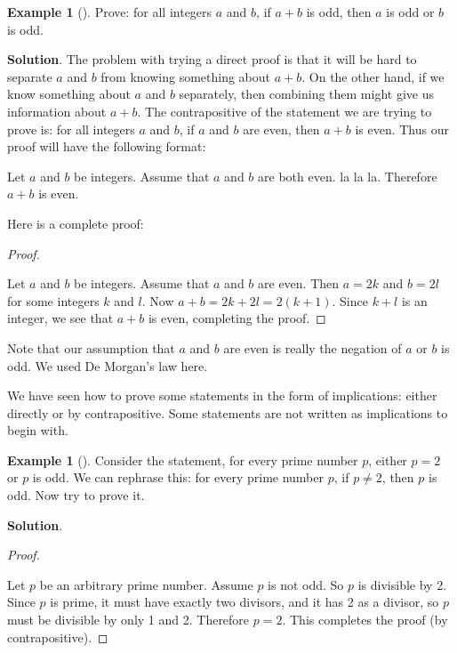 \documentclass[10pt,]{book}
\theoremstyle{plain}
\theoremstyle{definition}
\theoremstyle{definition}
\newtheorem{example}[theorem]{Example}
\theoremstyle{definition}
\theoremstyle{definition}
\numberwithin{equation}{chapter}
\begin{document}
\begin{example}[]\label{example-67}
\hypertarget{p-2065}{}%
Prove: for all integers \(a\) and \(b\), if \(a + b\) is odd, then \(a\) is odd or \(b\) is odd.%
\par\smallskip%
\noindent\textbf{Solution}.\hypertarget{solution-184}{}\quad%
\hypertarget{p-2066}{}%
The problem with trying a direct proof is that it will be hard to separate \(a\) and \(b\) from knowing something about \(a+b\). On the other hand, if we know something about \(a\) and \(b\) separately, then combining them might give us information about \(a+b\). The contrapositive of the statement we are trying to prove is: for all integers \(a\) and \(b\), if \(a\) and \(b\) are even, then \(a+b\) is even. Thus our proof will have the following format:%
\par
\hypertarget{p-2067}{}%
Let \(a\) and \(b\) be integers. Assume that \(a\) and \(b\) are both even. la la la. Therefore \(a+b\) is even.%
\par
\hypertarget{p-2068}{}%
Here is a complete proof:%
\begin{proof}\hypertarget{proof-24}{}
\hypertarget{p-2069}{}%
Let \(a\) and \(b\) be integers. Assume that \(a\) and \(b\) are even. Then \(a = 2k\) and \(b = 2l\) for some integers \(k\) and \(l\). Now \(a + b = 2k + 2l = 2(k+1)\). Since \(k + l\) is an integer, we see that \(a + b\) is even, completing the proof.%
\end{proof}
\hypertarget{p-2070}{}%
Note that our assumption that \(a\) and \(b\) are even is really the negation of \(a\) or \(b\) is odd. We used De Morgan's law here.%
\end{example}
\hypertarget{p-2071}{}%
We have seen how to prove some statements in the form of implications: either directly or by contrapositive. Some statements are not written as implications to begin with.%
\begin{example}[]\label{example-68}
\hypertarget{p-2072}{}%
Consider the statement, for every prime number \(p\), either \(p = 2\) or \(p\) is odd. We can rephrase this: for every prime number \(p\), if \(p \ne 2\), then \(p\) is odd. Now try to prove it.%
\par\smallskip%
\noindent\textbf{Solution}.\hypertarget{solution-185}{}\quad%
\begin{proof}\hypertarget{proof-25}{}
\hypertarget{p-2073}{}%
Let \(p\) be an arbitrary prime number. Assume \(p\) is not odd. So \(p\) is divisible by 2. Since \(p\) is prime, it must have exactly two divisors, and it has 2 as a divisor, so \(p\) must be divisible by only 1 and 2. Therefore \(p = 2\). This completes the proof (by contrapositive).%
\end{proof}
\end{example}
\typeout{************************************************}
\typeout{************************************************}
\end{document}

